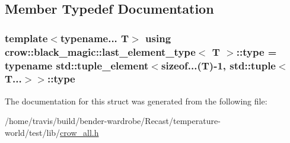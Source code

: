 \subsection{Member Typedef Documentation}
\hypertarget{structcrow_1_1black__magic_1_1last__element__type_a237aaa063e7286bb4e3fd2286f69dfe2}{
\subsubsection[{type}]{\setlength{\rightskip}{0pt plus 5cm}template$<$typename... T$>$ using {\bf crow\-::black\-\_\-magic\-::last\-\_\-element\-\_\-type}$<$ T $>$\-::{\bf type} =  typename std\-::tuple\-\_\-element$<$sizeof...(T)-\/1, std\-::tuple$<$T...$>$$>$\-::{\bf type}}}\label{structcrow_1_1black__magic_1_1last__element__type_a237aaa063e7286bb4e3fd2286f69dfe2}


The documentation for this struct was generated from the following file\-:\begin{DoxyCompactItemize}
\item 
/home/travis/build/bender-\/wardrobe/\-Recast/temperature-\/world/test/lib/\hyperlink{crow__all_8h}{crow\-\_\-all.\-h}\end{DoxyCompactItemize}
